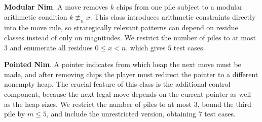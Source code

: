 \documentclass[review]{elsarticle}
\newcommand{\set}[1]{\{ #1 \}}
\newcommand{\tuple}[1]{\langle {#1} \rangle}
\newcommand{\true}{\top}
\newcommand{\statevar}{\mathcal{X}}
\newcommand{\act}{\mathcal{A}}
\newcommand{\constraint}{\mathcal{C}}
\newcommand{\estate}{\mathcal{E}}
\newcommand{\pre}{\mathtt{pre}}
\newcommand{\eff}{\mathtt{eff}}
\newcommand{\nmodulo}{\not \equiv}
\begin{document}
\textbf{Modular Nim}. A move removes $k$ chips from one pile subject to a modular arithmetic condition $k \nmodulo_n x$.
This class introduces arithmetic constraints directly into the move rule, so strategically relevant patterns can depend on residue classes instead of only on magnitudes.
We restrict the number of piles to at most $3$ and enumerate all residues $0 \le x < n$, which gives $5$ test cases.

\textbf{Pointed Nim}. A pointer indicates from which heap the next move must be made, and after removing chips the player must redirect the pointer to a different nonempty heap.
The crucial feature of this class is the additional control component, because the next legal move depends on the current pointer as well as the heap sizes.
We restrict the number of piles to at most $3$, bound the third pile by $m \le 5$, and include the unrestricted version, obtaining $7$ test cases.
\end{document}
